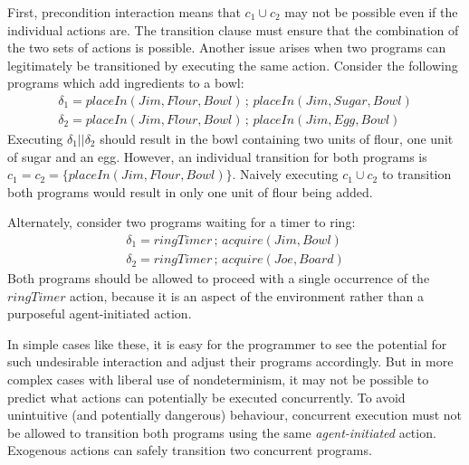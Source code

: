 First, precondition interaction means that $c_{1}\cup c_{2}$ may
not be possible even if the individual actions are. The transition
clause must ensure that the combination of the two sets of actions
is possible. Another issue arises when two programs can legitimately
be transitioned by executing the same action. Consider the following
programs which add ingredients to a bowl:\begin{gather*}
\delta_{1}=placeIn(Jim,Flour,Bowl)\,;\, placeIn(Jim,Sugar,Bowl)\\
\delta_{2}=placeIn(Jim,Flour,Bowl)\,;\, placeIn(Jim,Egg,Bowl)\end{gather*}
 Executing $\delta_{1}||\delta_{2}$ should result in the bowl containing
two units of flour, one unit of sugar and an egg. However, an individual
transition for both programs is $c_{1}=c_{2}=\{placeIn(Jim,Flour,Bowl)\}$.
Naively executing $c_{1}\cup c_{2}$ to transition both programs would
result in only one unit of flour being added.

Alternately, consider two programs waiting for a timer to ring:\begin{gather*}
\delta_{1}=ringTimer\,;\, acquire(Jim,Bowl)\\
\delta_{2}=ringTimer\,;\, acquire(Joe,Board)\end{gather*}
 Both programs should be allowed to proceed with a single occurrence
of the $ringTimer$ action, because it is an aspect of the environment
rather than a purposeful agent-initiated action.

In simple cases like these, it is easy for the programmer to see the
potential for such undesirable interaction and adjust their programs
accordingly. But in more complex cases with liberal use of nondeterminism,
it may not be possible to predict what actions can potentially be
executed concurrently. To avoid unintuitive (and potentially dangerous)
behaviour, concurrent execution must not be allowed to transition
both programs using the same \emph{agent-initiated} action. Exogenous
actions can safely transition two concurrent programs.


